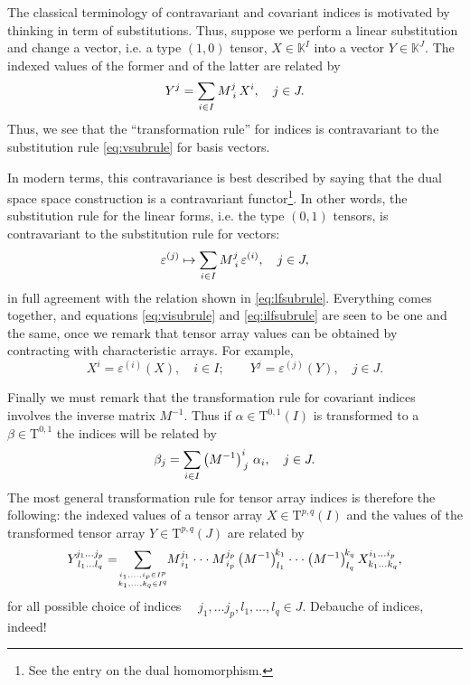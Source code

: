 \documentclass[12pt]{article}
\newcommand{\kfield}{\mathbb{K}}
\newcommand{\rT}{\mathrm{T}}
\newcommand{\tspace}[1]{\rT^{#1}}
\newcommand{\ca}{\varepsilon}
\newcommand{\ud}[2]{^{#1}_{\!\hphantom{#1}#2}}
\newcommand{\lp}{\left(}
\newcommand{\rp}{\right)}
\begin{document}
The classical terminology of contravariant and covariant indices is
motivated by thinking in term of substitutions.  Thus, suppose we
perform a linear substitution and change a vector, i.e. a type $(1,0)$
tensor, $X\in \kfield^I$ into a vector $Y\in \kfield^J$.  The indexed
values of the former and of the latter are related by
\begin{equation}
  \label{eq:visubrule}
  Y^j = \sum_{i\in I} M\ud{j}{i}\, X^i,\quad j\in J.
\end{equation}
Thus, we see
that the ``transformation rule'' for indices is contravariant to the
substitution rule \eqref{eq:vsubrule} for basis vectors.


In modern terms, this contravariance is best described by saying that
the dual space space construction is a contravariant functor\footnote{See the entry on the dual homomorphism.}.  In other
words, the substitution rule for the linear forms, i.e. the type
$(0,1)$ tensors, is contravariant to the substitution rule for
vectors:
\begin{equation}
  \label{eq:ilfsubrule}
  \ca^{(j)} \mapsto \sum_{i\in I} M\ud{j}{i}\, \ca^{(i)},\quad j\in
J,  
\end{equation}
in full agreement with the relation shown in \eqref{eq:lfsubrule}.
Everything comes together, and equations \eqref{eq:visubrule} and
\eqref{eq:ilfsubrule} are seen to be one and the same, once we remark
that tensor array values can be obtained by contracting with
characteristic arrays.  For example,
$$ X^i = \ca^{(i)}(X),\quad i\in I; \qquad Y^j = \ca^{(j)}(Y),\quad j\in J.$$


Finally we must remark that the transformation rule for covariant
indices involves the inverse matrix $M^{-1}$.   Thus if $\alpha\in
\tspace{0,1}(I)$ is transformed to a  $\beta\in \tspace{0,1}$ the
indices will be related by
$$\beta_j = \sum_{i\in I} \lp M^{-1}\rp\ud{i}{j}\, \alpha_i,\quad j\in
J.$$
The most general transformation rule for tensor array indices is
therefore the following: the indexed values of a tensor array $X\in
\tspace{p,q}(I)$  and the values of the transformed tensor array
$Y\in\tspace{p,q}(J)$ are related by
$$Y^{\!j_1\ldots j_p}_{\;l_1\ldots l_q} = \!\!
\sum_{\genfrac{}{}{0pt}{}{i_1,\ldots,i_p\in I^p}{k_1,\ldots,k_q\in
    I^q}} \!\!
 M^{j_1}_{\,i_1}\cdot\cdot\cdot M^{j_p}_{\,i_p} \lp M^{-1} \rp^{\!k_1}_{l_1}
\cdot\cdot\cdot \lp M^{-1} \rp^{\!k_q}_{l_q} X^{i_1\ldots i_p}_{k_1\ldots k_q},
$$
for all possible choice of indices
$\quad j_1,\ldots j_p,l_1,\ldots, l_q \in J.$
Debauche of indices, indeed!
\end{document}

